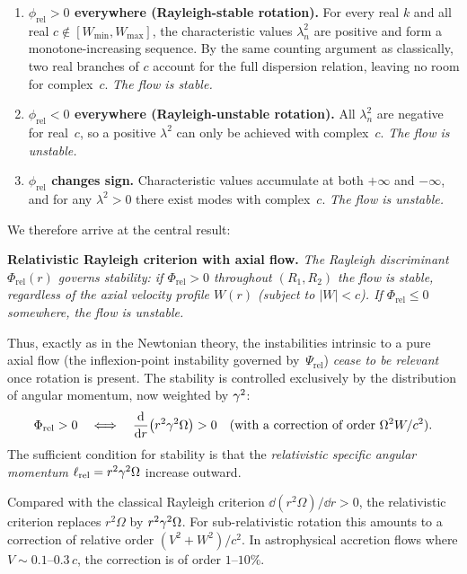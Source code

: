 \begin{enumerate}
\item \textbf{$\phi_{\mathrm{rel}}>0$ everywhere
  (Rayleigh-stable rotation).}
  For every real $k$ and all real $c\notin[W_{\min},W_{\max}]$, the
  characteristic values $\lambda_{n}^{2}$ are positive and form a
  monotone-increasing sequence.  By the same counting argument as
  classically, two real branches of $c$ account for the full
  dispersion relation, leaving no room for complex~$c$.
  \emph{The flow is stable.}

\item \textbf{$\phi_{\mathrm{rel}}<0$ everywhere
  (Rayleigh-unstable rotation).}
  All $\lambda_{n}^{2}$ are negative for real~$c$, so a positive
  $\lambda^{2}$ can only be achieved with complex~$c$.
  \emph{The flow is unstable.}

\item \textbf{$\phi_{\mathrm{rel}}$ changes sign.}
  Characteristic values accumulate at both $+\infty$ and $-\infty$,
  and for any $\lambda^{2}>0$ there exist modes with complex~$c$.
  \emph{The flow is unstable.}
\end{enumerate}

\noindent We therefore arrive at the central result:

\medskip
\noindent\textbf{Relativistic Rayleigh criterion with axial flow.}\;
\emph{The Rayleigh discriminant $\Phi_{\mathrm{rel}}(r)$ governs
stability:  if\/ $\Phi_{\mathrm{rel}}>0$ throughout
$(R_{1},R_{2})$ the flow is stable, regardless of the axial velocity
profile $W(r)$ (subject to $|W|<c$).  If\/ $\Phi_{\mathrm{rel}}\le 0$
somewhere, the flow is unstable.}

\medskip
Thus, exactly as in the Newtonian theory, the instabilities intrinsic
to a pure axial flow (the inflexion-point instability governed
by~$\Psi_{\mathrm{rel}}$) \emph{cease to be relevant} once rotation
is present.  The stability is controlled exclusively by the
distribution of angular momentum, now weighted by $\gamma^{2}$:
\begin{equation}
\label{eq:rel-8-232}
\Phi_{\mathrm{rel}} > 0
\quad\Longleftrightarrow\quad
\frac{\mathrm{d}}{\mathrm{d} r}\bigl(r^{2}\gamma^{2}\Omega\bigr) > 0
  \quad\text{(with a correction of order $\Omega^{2}W/c^{2}$)}.
\end{equation}
The sufficient condition for stability is that the \emph{relativistic
specific angular momentum} $\ell_{\mathrm{rel}}=r^{2}\gamma^{2}\Omega$
increase outward.

\begin{relcorrection}
Compared with the classical Rayleigh criterion
$\dd(r^{2}\Omega)/\dd r > 0$, the relativistic criterion replaces
$r^{2}\Omega$ by $r^{2}\gamma^{2}\Omega$.  For sub-relativistic rotation
this amounts to a correction of relative order
$(V^{2}+W^{2})/c^{2}$.  In astrophysical accretion flows where
$V\sim 0.1\text{--}0.3\,c$, the correction is of order
$1$--$10\%$.
\end{relcorrection}

